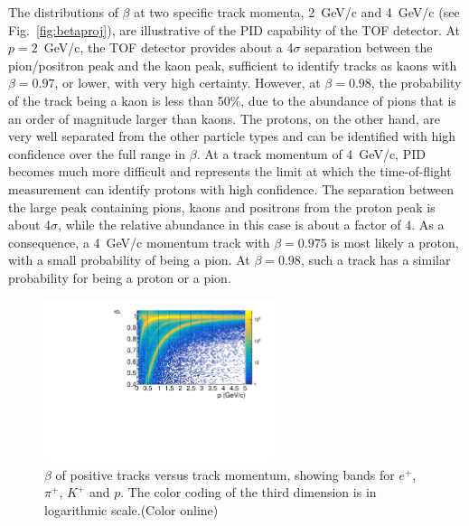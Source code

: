 The distributions of $\beta$ at two specific track momenta, 2~GeV/c and 4~GeV/c (see Fig.~\ref{fig:betaproj}), are illustrative of the PID capability of the TOF detector. At $p=2$~GeV/c, the TOF detector provides about a 4$\sigma$ separation between
the pion/positron peak and the kaon peak, sufficient to identify tracks as kaons with $\beta=0.97$, or lower, with very
high certainty. However, at  $\beta=0.98$, the probability of the track being a kaon is less than 50\%, due to the abundance of pions that is an order of magnitude larger than kaons. The protons, on the other hand, are very well
separated from the other particle types and can be identified with high confidence over the full range in $\beta$.
At a track momentum of 4~GeV/c, PID becomes much more difficult and represents the limit at which the time-of-flight measurement can identify protons with high confidence. The separation between the large peak containing pions, kaons and positrons from the proton
peak is about 4$\sigma$, while the relative abundance in this case is about a factor of 4. As a consequence, a 4~GeV/c momentum
track with $\beta=0.975$ is most likely a proton, with a small probability of being a pion. At $\beta=0.98$, such
a track has a similar probability for being a proton or a pion.
\begin{figure}[tbp]
\begin{center}    
\includegraphics[width=0.6\textwidth]{figures/beta_vs_p_positivetracks.pdf}
\caption{\label{fig:betavsp}$\beta$ of positive tracks versus track momentum, showing bands for $e^+$, $\pi^+$, $K^+$ and $p$. The color coding of the third dimension
is in logarithmic scale.(Color online)}
\end{center}
\end{figure}

